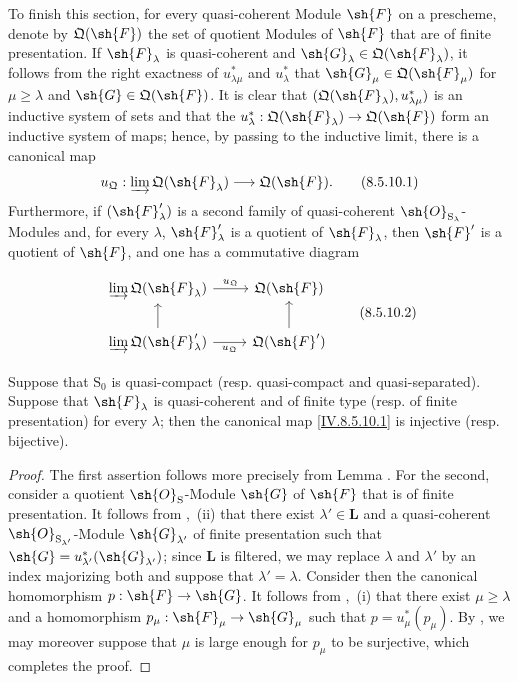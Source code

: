 \begin{env}[8.5.10]
\label{IV.8.5.10}
To finish this section, for every quasi-coherent Module $\sh{F}$ on a prescheme, denote by $\mathfrak{Q}(\sh{F})$ the set of quotient Modules of $\sh{F}$ that are of finite presentation. If $\sh{F}_\lambda$ is quasi-coherent and $\sh{G}_\lambda\in\mathfrak{Q}(\sh{F}_\lambda)$, it follows from the right exactness of $u_{\lambda\mu}^*$ and $u_\lambda^*$ that $\sh{G}_\mu\in\mathfrak{Q}(\sh{F}_\mu)$ for $\mu\geqslant\lambda$ and $\sh{G}\in\mathfrak{Q}(\sh{F})$. It is clear that $(\mathfrak{Q}(\sh{F}_\lambda),u_{\lambda\mu}^*)$ is an inductive system of sets and that the $u_\lambda^*:\mathfrak{Q}(\sh{F}_\lambda)\to\mathfrak{Q}(\sh{F})$ form an inductive system of maps; hence, by passing to the inductive limit, there is a canonical map
\[
u_{\mathfrak{Q}}:\varinjlim\mathfrak{Q}(\sh{F}_\lambda)\longrightarrow\mathfrak{Q}(\sh{F}).
\tag{8.5.10.1}\label{IV.8.5.10.1}
\]
Furthermore, if $(\sh{F}'_\lambda)$ is a second family of quasi-coherent $\sh{O}_{\mathrm{S}_\lambda}$-Modules and, for every $\lambda$, $\sh{F}'_\lambda$ is a quotient of $\sh{F}_\lambda$, then $\sh{F}'$ is a quotient of $\sh{F}$, and one has a commutative diagram


\[
\begin{tikzcd}
\varinjlim\mathfrak{Q}(\sh{F}_\lambda) \ar[r,"u_{\mathfrak{Q}}"] & \mathfrak{Q}(\sh{F}) \\
\varinjlim\mathfrak{Q}(\sh{F}'_\lambda) \ar[r,"u_{\mathfrak{Q}}"'] \ar[u] & \mathfrak{Q}(\sh{F}') \ar[u]
\end{tikzcd}
\tag{8.5.10.2}\label{IV.8.5.10.2}
\]
\end{env}

\begin{proposition}[8.5.11]
\label{IV.8.5.11}
Suppose that $\mathrm{S}_0$ is quasi-compact (resp. quasi-compact and quasi-separated). Suppose that $\sh{F}_\lambda$ is quasi-coherent and of finite type (resp. of finite presentation) for every $\lambda$; then the canonical map \eqref{IV.8.5.10.1} is injective (resp. bijective).
\end{proposition}

\begin{proof}
The first assertion follows more precisely from Lemma . For the second, consider a quotient $\sh{O}_{\mathrm{S}}$-Module $\sh{G}$ of $\sh{F}$ that is of finite presentation. It follows from ,~(ii) that there exist $\lambda'\in\mathbf{L}$ and a quasi-coherent $\sh{O}_{\mathrm{S}_{\lambda'}}$-Module $\sh{G}_{\lambda'}$ of finite presentation such that $\sh{G}=u_{\lambda'}^*(\sh{G}_{\lambda'})$; since $\mathbf{L}$ is filtered, we may replace $\lambda$ and $\lambda'$ by an index majorizing both and suppose that $\lambda'=\lambda$. Consider then the canonical homomorphism $p:\sh{F}\to\sh{G}$. It follows from ,~(i) that there exist $\mu\geqslant\lambda$ and a homomorphism $p_\mu:\sh{F}_\mu\to\sh{G}_\mu$ such that $p=u_\mu^*(p_\mu)$. By , we may moreover suppose that $\mu$ is large enough for $p_\mu$ to be surjective, which completes the proof.
\end{proof}

